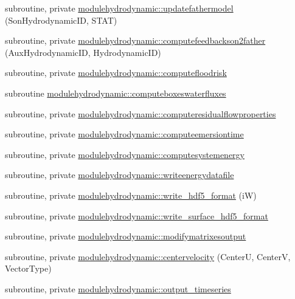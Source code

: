 \begin{DoxyCompactItemize}
\item 
subroutine, private \mbox{\hyperlink{namespacemodulehydrodynamic_a18824f0ade9c1b8a9140a405a5a343db}{modulehydrodynamic\+::updatefathermodel}} (Son\+Hydrodynamic\+ID, S\+T\+AT)
\item 
subroutine, private \mbox{\hyperlink{namespacemodulehydrodynamic_a83eb2d1806304e7bfac59fbf155291e4}{modulehydrodynamic\+::computefeedbackson2father}} (Aux\+Hydrodynamic\+ID, Hydrodynamic\+ID)
\item 
subroutine, private \mbox{\hyperlink{namespacemodulehydrodynamic_a3ccbfcaea30af1d03bc8f158f2262081}{modulehydrodynamic\+::computefloodrisk}}
\item 
subroutine \mbox{\hyperlink{namespacemodulehydrodynamic_a7eac8d5b6aff29b714f987f3bedd3a6a}{modulehydrodynamic\+::computeboxeswaterfluxes}}
\item 
subroutine, private \mbox{\hyperlink{namespacemodulehydrodynamic_a8f5cfb7e074cb11c3c46454e53806111}{modulehydrodynamic\+::computeresidualflowproperties}}
\item 
subroutine, private \mbox{\hyperlink{namespacemodulehydrodynamic_a15232a4b6e4a92f5147fcf1428ebe0c0}{modulehydrodynamic\+::computeemersiontime}}
\item 
subroutine, private \mbox{\hyperlink{namespacemodulehydrodynamic_a5267d6e9c0f3efab032ca1f82881b5dd}{modulehydrodynamic\+::computesystemenergy}}
\item 
subroutine, private \mbox{\hyperlink{namespacemodulehydrodynamic_a99c46c970a39feb3ece42b919ed01d08}{modulehydrodynamic\+::writeenergydatafile}}
\item 
subroutine, private \mbox{\hyperlink{namespacemodulehydrodynamic_affc6eb8b5c260e1da6146c7a34c7849b}{modulehydrodynamic\+::write\+\_\+hdf5\+\_\+format}} (iW)
\item 
subroutine, private \mbox{\hyperlink{namespacemodulehydrodynamic_ae031a7cef6170ae4c1b13ffb602108a6}{modulehydrodynamic\+::write\+\_\+surface\+\_\+hdf5\+\_\+format}}
\item 
subroutine, private \mbox{\hyperlink{namespacemodulehydrodynamic_a855667e612812156b0ef3370781b2665}{modulehydrodynamic\+::modifymatrixesoutput}}
\item 
subroutine, private \mbox{\hyperlink{namespacemodulehydrodynamic_a7bcb9032bfe7bf84ef03ab8c66f0f159}{modulehydrodynamic\+::centervelocity}} (CenterU, CenterV, Vector\+Type)
\item 
subroutine, private \mbox{\hyperlink{namespacemodulehydrodynamic_ab09a29c4bbdb3a0c03a3e8630b2d0829}{modulehydrodynamic\+::output\+\_\+timeseries}}

\end{DoxyCompactItemize}
